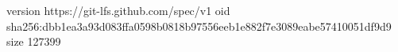 version https://git-lfs.github.com/spec/v1
oid sha256:dbb1ea3a93d083ffa0598b0818b97556eeb1e882f7e3089eabe57410051df9d9
size 127399
